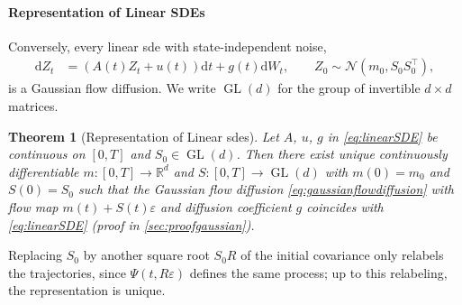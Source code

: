 \documentclass{article} %
\newcommand{\vol}{g}
\newcommand{\flow}{\Psi}
\newcommand{\gl}{\operatorname{GL}}
\newcommand{\diff}{{\mathrm{d}}}
\newcommand{\Norm}{\mathcal{N}}
\newcommand{\reals}{\mathbb{R}}
\newtheorem{theorem}{Theorem}
\begin{document}
\paragraph{Representation of Linear SDEs}
Conversely, every linear \gls{sde} with state-independent noise,
\begin{align}
    \diff Z_t &= \left(A(t) Z_t + u(t)\right) \diff t+ \vol(t)\diff W_t, \qquad Z_0 \sim \Norm(m_0, S_0 S_0^\top), \label{eq:linearSDE}
\end{align}
is a Gaussian flow diffusion. We write $\gl(d)$ for the group of invertible $d \times d$ matrices.
\begin{theorem}[Representation of Linear \glspl{sde}]
    \label{thm:representation}
    Let $A$, $u$, $\vol$ in \cref{eq:linearSDE} be continuous on $[0,T]$ and $S_0\in \gl(d)$. Then there exist unique continuously differentiable $m : [0, T] \to \reals^d$ and $S : [0, T] \to \gl(d)$ with $m(0)=m_0$ and $S(0)=S_0$ such that the Gaussian flow diffusion \cref{eq:gaussianflowdiffusion} with flow map $m(t) + S(t) \varepsilon$ and diffusion coefficient $\vol$ coincides with \cref{eq:linearSDE} (proof in \cref{sec:proofgaussian}).
\end{theorem}
Replacing $S_0$ by another square root $S_0 R$ of the initial covariance only relabels the trajectories, since $\flow(t, R \varepsilon)$ defines the same process; up to this relabeling, the representation is unique.
\end{document}
